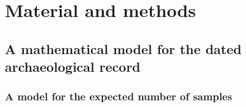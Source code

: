 \documentclass[a4paper]{article}
\begin{document}


\section*{\centering Material and methods}


\subsection*{A mathematical model for the dated archaeological record}

\subsubsection*{A model for the expected number of samples}
\end{document}
